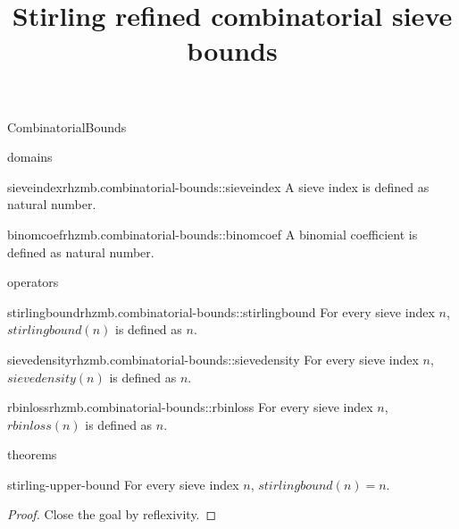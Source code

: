 \begin{lexlean}{CombinatorialBounds}
\title{Stirling refined combinatorial sieve bounds}

\begin{section}{domains}
  \begin{typedefinition}{sieveindex}{rhzmb.combinatorial-bounds::sieveindex}
  \noaxioms
  A sieve index is defined as natural number.
  \end{typedefinition}

  \begin{typedefinition}{binomcoef}{rhzmb.combinatorial-bounds::binomcoef}
  \noaxioms
  A binomial coefficient is defined as natural number.
  \end{typedefinition}
\end{section}

\begin{section}{operators}
  \begin{termdefinition}{stirlingbound}{rhzmb.combinatorial-bounds::stirlingbound}
  \noaxioms
  For every sieve index \(n\), \(stirlingbound(n)\) is defined as \(n\).
  \end{termdefinition}

  \begin{termdefinition}{sievedensity}{rhzmb.combinatorial-bounds::sievedensity}
  \noaxioms
  For every sieve index \(n\), \(sievedensity(n)\) is defined as \(n\).
  \end{termdefinition}

  \begin{termdefinition}{rbinloss}{rhzmb.combinatorial-bounds::rbinloss}
  \noaxioms
  For every sieve index \(n\), \(rbinloss(n)\) is defined as \(n\).
  \end{termdefinition}
\end{section}

\begin{section}{theorems}
  \begin{theorem}{stirling-upper-bound}
  \noaxioms
  For every sieve index \(n\), \(stirlingbound(n) = n\).
  \begin{proof}
  Close the goal by reflexivity.
  \end{proof}
  \end{theorem}


\end{section}
\end{lexlean}
